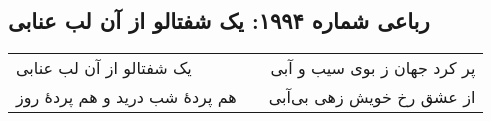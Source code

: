\begin{center}
\section*{رباعی شماره ۱۹۹۴: یک شفتالو از آن لب عنابی}
\label{sec:1994}
\begin{longtable}{l p{0.5cm} r}
یک شفتالو از آن لب عنابی
&&
پر کرد جهان ز بوی سیب و آبی
\\
هم پردهٔ شب درید و هم پردهٔ روز
&&
از عشق رخ خویش زهی بی‌آبی
\\
\end{longtable}
\end{center}
